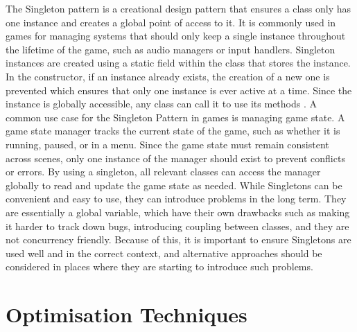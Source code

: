 \documentclass[10pt]{final_report}
\begin{document}
The Singleton pattern is a creational design pattern that ensures a class only has one instance and creates a global point of access to it. It is commonly used in games for managing systems that should only keep a single instance throughout the lifetime of the game, such as audio managers or input handlers.
Singleton instances are created using a static field within the class that stores the instance. In the constructor, if an instance already exists, the creation of a new one is prevented which ensures that only one instance is ever active at a time. Since the instance is globally accessible, any class can call it to use its methods \cite{Doran2017}. A common use case for the Singleton Pattern in games is managing game state. A game state manager tracks the current state of the game, such as whether it is running, paused, or in a menu. Since the game state must remain consistent across scenes, only one instance of the manager should exist to prevent conflicts or errors. By using a singleton, all relevant classes can access the manager globally to read and update the game state as needed. \newline
While Singletons can be convenient and easy to use, they can introduce problems in the long term. They are essentially a global variable, which have their own drawbacks such as making it harder to track down bugs, introducing coupling between classes, and they are not concurrency friendly. Because of this, it is important to ensure Singletons are used well and in the correct context, and alternative approaches should be considered in places where they are starting to introduce such problems.

\section{Optimisation Techniques}\label{optimisation}
\end{document}

